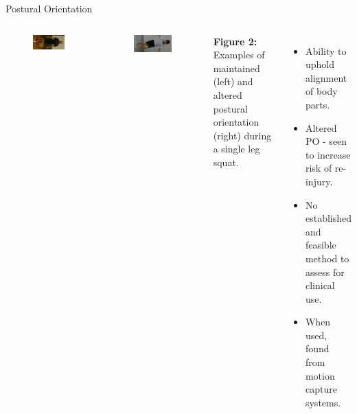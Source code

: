 \begin{frame}[fragile]{Postural Orientation}
  \begin{columns}[T,onlytextwidth]
    \centering
  \begin{columns}[T,onlytextwidth]

      \begin{figure}
        \raggedleft
        \includegraphics[angle=90,height=0.7\textheight]{files/figs/presentation/good-poe.png}
      \end{figure}

      \begin{figure}
        \raggedright
        \includegraphics[angle=90,height=0.7\textheight]{files/figs/presentation/poor-poe.png}
      \end{figure}
  \end{columns}
  {\scriptsize\textbf{Figure 2:} Examples of maintained (left) and altered postural orientation (right) during a single leg squat. \newline}
  \begin{itemize}
    \item Ability to uphold alignment of body parts.
    \item Altered PO - seen to increase risk of re-injury.
    \item No established and feasible method to assess for clinical use.
    \item When used, found from motion capture systems.
  \end{itemize}
  \end{columns}


\end{frame}
